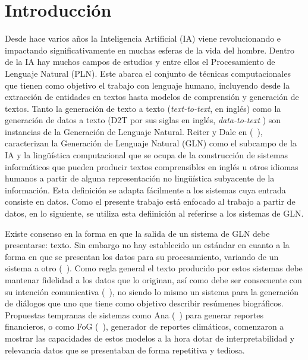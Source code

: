 \chapter*{Introducción}\label{chapter:introduction}

    Desde hace varios años la Inteligencia Artificial (IA) viene revolucionando e \\impactando significativamente en muchas esferas de la 
vida del hombre. Dentro de la IA hay muchos campos de estudios y entre ellos el Procesamiento de Lenguaje Natural (PLN). Este abarca el conjunto de 
t\'ecnicas computacionales que tienen como objetivo el trabajo con lenguaje humano, incluyendo desde la extracci\'on de entidades en textos hasta modelos 
de comprensi\'on y generación de textos. Tanto la generación de texto a texto (\emph{text-to-text}, en inglés) como la generación de 
datos a texto (D2T por sus siglas en inglés, \emph{data-to-text} ) son instancias de la Generación de Lenguaje Natural. Reiter y Dale en (~\cite{Reiter1997BuildingAN}), 
caracterizan la Generación de Lenguaje Natural (GLN) como el subcampo de la IA y la lingüística computacional que se ocupa de la construcción de sistemas informáticos que pueden 
producir textos comprensibles en inglés u otros idiomas humanos a partir de alguna representación no lingüística subyacente de la información. 
Esta definición se adapta fácilmente a los sistemas cuya entrada consiste en datos. Como el presente trabajo está enfocado al trabajo a partir de datos, en lo siguiente, se 
utiliza esta defiinición al referirse a los sistemas de GLN. 
    
    Existe consenso en la forma en que la salida de un sistema de GLN debe presentarse: texto. Sin embargo no hay establecido un est\'andar en cuanto a la forma en 
que se presentan los datos para su procesamiento, variando de un sistema a otro (~\cite{reiter_dale_2000,Gatt2018SurveyOT}). Como regla general el texto producido por estos sistemas 
debe mantenar fidelidad a los datos que lo originan, así como debe ser consecuente con su intención comunicativa (~\cite{reiter_dale_2000}), no siendo lo mismo un 
sistema para la generación de diálogos que uno que tiene como objetivo describir resúmenes biográficos. Propuestas tempranas de sistemas como Ana (~\cite{kukich1983design}) para 
generar reportes financieros, o como FoG (~\cite{goldberg1994using}), generador de reportes climáticos, comenzaron a mostrar las capacidades de estos 
modelos a la hora dotar de interpretabilidad y relevancia datos que se presentaban de forma repetitiva y tediosa.
  
